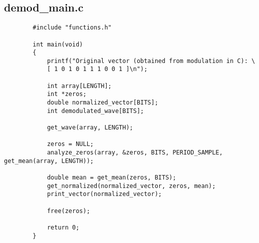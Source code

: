 \documentclass[11pt,a4paper]{report}
\begin{document}
		
	\subsection{demod\_main.c}
		\begin{verbatim}
		#include "functions.h"
		
		int main(void)
		{
			printf("Original vector (obtained from modulation in C): \
			[ 1 0 1 0 1 1 1 0 0 1 ]\n");
			
			int array[LENGTH];
			int *zeros;
			double normalized_vector[BITS];
			int demodulated_wave[BITS];
			
			get_wave(array, LENGTH);
			
			zeros = NULL;
			analyze_zeros(array, &zeros, BITS, PERIOD_SAMPLE, get_mean(array, LENGTH));
			
			double mean = get_mean(zeros, BITS);
			get_normalized(normalized_vector, zeros, mean);
			print_vector(normalized_vector);
			
			free(zeros);
			
			return 0;
		}
		\end{verbatim}
		
	

	
		
\end{document}
